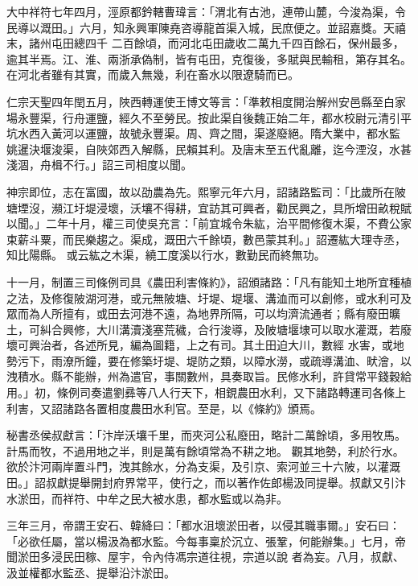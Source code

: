 \begin{pinyinscope}
 大中祥符七年四月，涇原都鈐轄曹瑋言：「渭北有古池，連帶山麓，今浚為渠，令民導以溉田。」六月，知永興軍陳堯咨導龍首渠入城，民庶便之。並詔嘉獎。天禧末，諸州屯田總四千
 二百餘頃，而河北屯田歲收二萬九千四百餘石，保州最多，逾其半焉。江、淮、兩浙承偽制，皆有屯田，克復後，多賦與民輸租，第存其名。在河北者雖有其實，而歲入無幾，利在畜水以限遼騎而已。



 仁宗天聖四年閏五月，陜西轉運使王博文等言：「準敕相度開治解州安邑縣至白家場永豐渠，行舟運鹽，經久不至勞民。按此渠自後魏正始二年，都水校尉元清引平坑水西入黃河以運鹽，故號永豐渠。周、齊之間，渠遂廢絕。隋大業中，都水監
 姚暹決堰浚渠，自陜郊西入解縣，民賴其利。及唐末至五代亂離，迄今湮沒，水甚淺涸，舟楫不行。」詔三司相度以聞。



 神宗即位，志在富國，故以劭農為先。熙寧元年六月，詔諸路監司：「比歲所在陂塘堙沒，瀕江圩堤浸壞，沃壤不得耕，宜訪其可興者，勸民興之，具所增田畝稅賦以聞。」二年十月，權三司使吳充言：「前宜城令朱紘，治平間修復木渠，不費公家束薪斗粟，而民樂趨之。渠成，溉田六千餘頃，數邑蒙其利。」詔遷紘大理寺丞，知比陽縣。
 或云紘之木渠，繞工度溪以行水，數勤民而終無功。



 十一月，制置三司條例司具《農田利害條約》，詔頒諸路：「凡有能知土地所宜種植之法，及修復陂湖河港，或元無陂塘、圩堤、堤堰、溝洫而可以創修，或水利可及眾而為人所擅有，或田去河港不遠，為地界所隔，可以均濟流通者；縣有廢田曠土，可糾合興修，大川溝瀆淺塞荒穢，合行浚導，及陂塘堰埭可以取水灌溉，若廢壞可興治者，各述所見，編為圖籍，上之有司。其土田迫大川，數經
 水害，或地勢污下，雨潦所鐘，要在修築圩堤、堤防之類，以障水澇，或疏導溝洫、畎澮，以洩積水。縣不能辦，州為遣官，事關數州，具奏取旨。民修水利，許貸常平錢穀給用。」初，條例司奏遣劉彞等八人行天下，相鋧農田水利，又下諸路轉運司各條上利害，又詔諸路各置相度農田水利官。至是，以《條約》頒焉。



 秘書丞侯叔獻言：「汴岸沃壤千里，而夾河公私廢田，略計二萬餘頃，多用牧馬。計馬而牧，不過用地之半，則是萬有餘頃常為不耕之地。
 觀其地勢，利於行水。欲於汴河兩岸置斗門，洩其餘水，分為支渠，及引京、索河並三十六陂，以灌溉田。」詔叔獻提舉開封府界常平，使行之，而以著作佐郎楊汲同提舉。叔獻又引汴水淤田，而祥符、中牟之民大被水患，都水監或以為非。



 三年三月，帝謂王安石、韓絳曰：「都水沮壞淤田者，以侵其職事爾。」安石曰：「必欲任屬，當以楊汲為都水監。今每事稟於沉立、張鞏，何能辦集。」七月，帝聞淤田多浸民田稼、屋宇，令內侍馮宗道往視，宗道以說
 者為妄。八月，叔獻、汲並權都水監丞、提舉沿汴淤田。




\end{pinyinscope}
